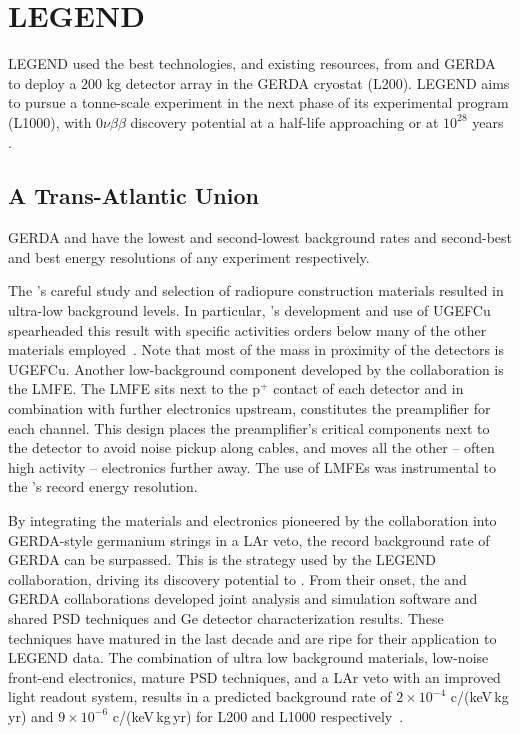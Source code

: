 \chapter{LEGEND}\label{chap:legend}

LEGEND used the best technologies, and existing resources, from {\MJMit} and GERDA to deploy a 200 kg detector array in the GERDA cryostat (L200). LEGEND aims to pursue a tonne-scale \geEn{} experiment in the next phase of its experimental program (L1000), with $0\nu\beta\beta$ discovery potential at a half-life approaching or at $10^{28}$ years \cite{LEGEND2021}. 

\section{A Trans-Atlantic Union}

GERDA and {\MJMit} have the lowest and second-lowest background rates and second-best and best energy resolutions of any \novbb{} experiment respectively.

The {\MJDEMit}'s careful study and selection of radiopure construction materials resulted in ultra-low background levels. In particular, {\MJMit}'s development and use of UGEFCu spearheaded this result with specific activities orders below many of the other materials employed~\cite{assaypaper}. Note that most of the mass in proximity of the detectors is UGEFCu. Another low-background component developed by the {\MJMit} collaboration is the LMFE. The LMFE sits next to the p$^+$ contact of each detector and in combination with further electronics upstream, constitutes the preamplifier for each channel. This design places the preamplifier's critical components next to the detector to avoid noise pickup along cables, and moves all the other -- often high activity -- electronics further away. The use of LMFEs was instrumental to the {\DEMit}'s record energy resolution.

By integrating the materials and electronics pioneered by the {\MJMit} collaboration into GERDA-style germanium strings in a LAr veto, the record background rate of GERDA can be surpassed. This is the strategy used by the LEGEND collaboration, driving its discovery potential to \novbb{}. From their onset, the {\MJMit} and GERDA collaborations developed joint analysis and simulation software and shared PSD techniques and Ge detector characterization results. These techniques have matured in the last decade and are ripe for their application to LEGEND data. The combination of ultra low background materials, low-noise front-end electronics, mature PSD techniques, and a LAr veto with an improved light readout system, results in a predicted background rate of $2 \times 10^{-4}$ c/(keV\,kg\,yr) and $9 \times 10^{-6}$ c/(keV\,kg\,yr) for L200 and L1000 respectively~\cite{legend_pcdr}. 

